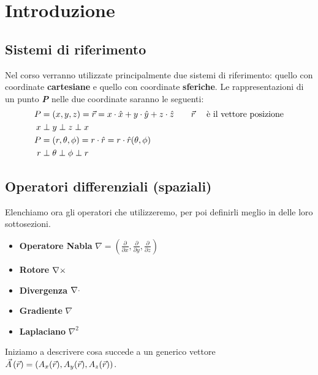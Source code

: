 \chapter{Introduzione}
\section{Sistemi di riferimento}
Nel corso verranno utilizzate principalmente due sistemi di riferimento: quello
con coordinate \textbf{cartesiane} e quello con coordinate \textbf{sferiche}.
Le rappresentazioni di un punto \textit{\textbf{P}} nelle due coordinate saranno le seguenti:
\begin{equation} \begin{split}
  P&=(x,y,z) = \vec{r} = x \cdot \hat{x} + y \cdot \hat{y} +z \cdot \hat{z}  \quad \quad \vec{r}&\text{ è il vettore posizione} \\
  x &\perp y \perp z \perp x \\
  P&=(r,\theta,\phi) = r \cdot \hat{r} = r \cdot \hat{r}(\theta,\phi)\\
  r &\perp \theta \perp \phi \perp r
  \label{eq:riferimento}
\end{split}\end{equation}

\section{Operatori differenziali (spaziali)}
Elenchiamo ora gli operatori che utilizzeremo, per poi definirli meglio in delle loro sottosezioni.
\begin{itemize}
  \item \textbf{Operatore Nabla} $ \nabla = \left(\frac{\partial}{\partial x},\frac{\partial}{\partial y},\frac{\partial}{\partial z}\right)$
  \item \textbf{Rotore} $\nabla\times$
  \item \textbf{Divergenza} $\nabla\cdot$
  \item \textbf{Gradiente} $\nabla$
  \item \textbf{Laplaciano} $\nabla^2$
\end{itemize}
Iniziamo a descrivere cosa succede a un generico vettore $\vec{A}\left(\vec{r}\right)=\left(A_x(\vec{r}),A_y(\vec{r}),A_z(\vec{r})\right)$.
